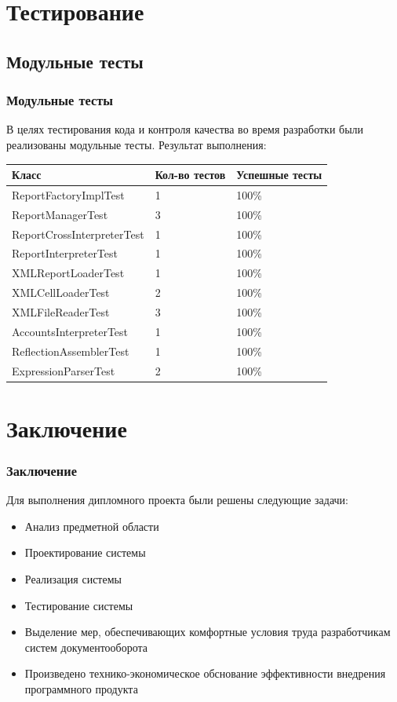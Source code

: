 \documentclass[xcolor=pdftex, dvipsnames, table]{beamer}
\begin{document}
\section{Тестирование}
\subsection{Модульные тесты}
\begin{frame}
  \frametitle{Модульные тесты}
  В целях тестирования кода и контроля качества во время разработки были реализованы модульные тесты.
  Результат выполнения:
  \begin{center}
    \small {
      \begin{tabular}{|m{4cm}|m{2cm}|m{2cm}|} \hline
        Класс & Кол-во тестов & Успешные тесты \\ \hline
        ReportFactoryImplTest & 1 & 100\% \\ \hline
        ReportManagerTest & 3 & 100\% \\ \hline
        ReportCrossInterpreterTest & 1 & 100\% \\ \hline
        ReportInterpreterTest & 1 & 100\% \\ \hline
        XMLReportLoaderTest & 1 & 100\% \\ \hline
        XMLCellLoaderTest & 2 & 100\% \\ \hline
        XMLFileReaderTest & 3 & 100\% \\ \hline
        AccountsInterpreterTest & 1 & 100\% \\ \hline
        ReflectionAssemblerTest & 1 & 100\% \\ \hline
        ExpressionParserTest & 2 & 100\% \\ \hline
      \end{tabular}
    }
  \end{center}
\end{frame}

\section{Заключение}
\begin{frame}
  \frametitle{Заключение}
  Для выполнения дипломного проекта были решены следующие задачи:
  \begin{itemize}
    \item Анализ предметной области
    \item Проектирование системы
    \item Реализация системы
    \item Тестирование системы
    \item Выделение мер, обеспечивающих комфортные условия труда разработчикам систем документооборота
    \item Произведено технико-экономическое обснование эффективности внедрения программного продукта
  \end{itemize}
\end{frame}
\end{document}

